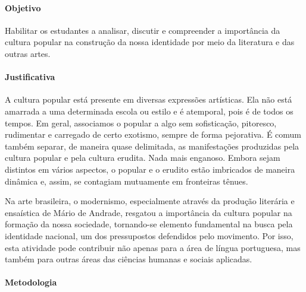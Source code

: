 \documentclass[12pt]{extarticle}
\begin{document}
\paragraph{Objetivo} Habilitar os estudantes a analisar, discutir e
compreender a importância da cultura popular na construção da nossa
identidade por meio da literatura e das outras artes.

\paragraph{Justificativa} A cultura popular está presente em diversas
expressões artísticas. Ela não está amarrada a uma determinada escola ou
estilo e é atemporal, pois é de todos os tempos. Em geral, associamos
o popular a algo sem sofisticação, pitoresco, rudimentar e carregado de
certo exotismo, sempre de forma pejorativa. É comum também separar, de
maneira quase delimitada, as manifestações produzidas pela cultura
popular e pela cultura erudita. Nada mais enganoso. Embora sejam
distintos em vários aspectos, o popular e o erudito estão imbricados de
maneira dinâmica e, assim, se contagiam mutuamente em fronteiras
tênues.

Na arte brasileira, o modernismo, especialmente através da produção
literária e ensaística de Mário de Andrade, resgatou a importância da
cultura popular na formação da nossa sociedade, tornando-se elemento
fundamental na busca pela identidade nacional, um dos pressupostos defendidos pelo movimento. Por isso, esta atividade pode contribuir não apenas para a área de língua portuguesa, mas também para outras áreas das ciências humanas e sociais aplicadas.




\paragraph{Metodologia} 
\end{document}
